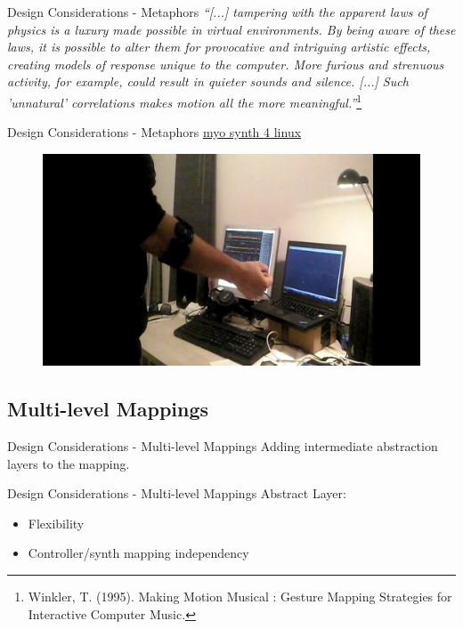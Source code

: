 \documentclass{beamer}
\begin{document}
\begin{frame}{Design Considerations - Metaphors}
    \textit{“[...] tampering with the apparent laws of physics is a luxury made possible in virtual environments. By being aware of these laws, it is possible to alter them for provocative and intriguing artistic effects, creating models of response unique to the computer. More furious and strenuous activity, for example, could result in quieter sounds and silence. [...] Such 'unnatural' correlations makes motion all the more meaningful.”}\footnote{Winkler, T. (1995). Making Motion Musical : Gesture Mapping Strategies for Interactive Computer Music.}
\end{frame}

\begin{frame}{Design Considerations - Metaphors}
    \href{https://vimeo.com/151326521}{myo synth 4 linux}
    \begin{figure}[h]
        \includegraphics[width=\textwidth]{myosynth.jpg}
    \end{figure}
\end{frame}

\subsection{Multi-level Mappings}

\begin{frame}{Design Considerations - Multi-level Mappings}
    Adding intermediate abstraction layers to the mapping.
\end{frame}

\begin{frame}{Design Considerations - Multi-level Mappings}
    Abstract Layer: 
    \begin{itemize}
        \item Flexibility
        \item Controller/synth mapping independency
    \end{itemize}
\end{frame}
\end{document}
